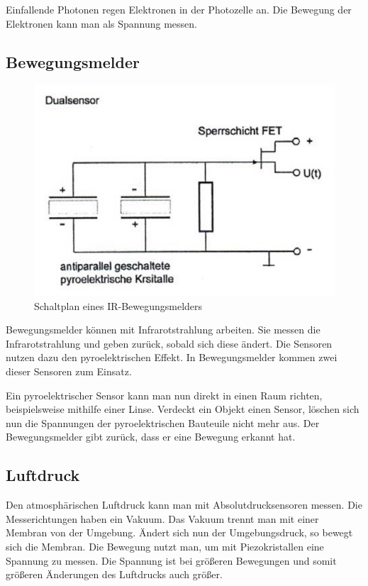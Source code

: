 Einfallende Photonen regen Elektronen in der Photozelle an. Die Bewegung der Elektronen kann man als Spannung messen.

\cite{mc}

\subsection{Bewegungsmelder}
\begin{figure}
\includegraphics[scale=0.4]{bilder/bewegungsmelder} 
\caption[Schaltplan eines IR-Bewegungsmelders]{Schaltplan eines IR-Bewegungsmelders \cite{UniMuenchen}}
\label{Bewegungsmelder}
\end{figure}
Bewegungsmelder können mit Infrarotstrahlung arbeiten. Sie messen die Infrarotstrahlung und geben zurück, sobald sich diese ändert. 
Die Sensoren nutzen dazu den pyroelektrischen Effekt. In Bewegungsmelder kommen zwei dieser Sensoren zum Einsatz.   



Ein pyroelektrischer Sensor kann man nun direkt in einen Raum richten, beispielsweise mithilfe einer Linse. Verdeckt ein Objekt einen Sensor, löschen sich nun die Spannungen der pyroelektrischen Bauteuile nicht mehr aus. Der Bewegungsmelder gibt zurück, dass er eine Bewegung erkannt hat. 

\cite{UniMuenchen}

\subsection{Luftdruck}
Den atmosphärischen Luftdruck kann man mit Absolutdrucksensoren messen. Die Messerichtungen haben ein Vakuum. Das Vakuum trennt man mit einer Membran von der Umgebung. Ändert sich nun der Umgebungsdruck, so bewegt sich die Membran. Die Bewegung nutzt man, um mit Piezokristallen eine Spannung zu messen. Die Spannung ist bei größeren Bewegungen und somit größeren Änderungen des Luftdrucks auch größer.

